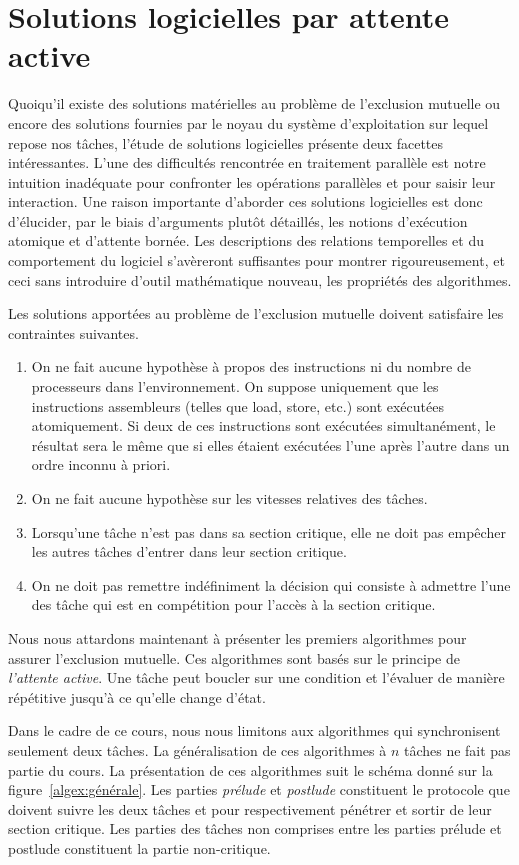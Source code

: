\section{Solutions logicielles par attente active}
Quoiqu'il existe des solutions matérielles au problème de l'exclusion mutuelle ou encore des solutions fournies par le noyau du système d'exploitation sur lequel repose nos tâches, l'étude de solutions logicielles présente deux facettes intéressantes.  L'une des difficultés rencontrée en traitement parallèle est notre intuition inadéquate pour confronter les opérations parallèles et pour saisir leur interaction. Une raison importante d'aborder ces solutions logicielles est donc d'élucider, par le biais d'arguments plutôt détaillés, les notions d'exécution atomique et d'attente bornée.
Les descriptions des relations temporelles et du comportement du logiciel s'avèreront suffisantes pour montrer rigoureusement, et ceci sans introduire d'outil mathématique nouveau, les propriétés des algorithmes.

Les solutions apportées au problème de l'exclusion mutuelle doivent satisfaire les contraintes suivantes.
\begin{enumerate}
  \item On ne fait aucune hypothèse à propos des instructions ni du nombre de processeurs dans l'environnement.
        On suppose uniquement que les instructions assembleurs (telles que load, store, etc.) sont exécutées atomiquement.  Si deux de ces instructions sont exécutées simultanément, le résultat sera le même que si elles étaient exécutées l'une après l'autre dans un ordre inconnu à priori.
  \item On ne fait aucune hypothèse sur les vitesses relatives des tâches.
  \item Lorsqu'une tâche n'est pas dans sa section critique, elle ne doit pas empêcher les autres tâches d'entrer dans leur section critique.
  \item On ne doit pas remettre indéfiniment la décision qui consiste à admettre l'une des tâche qui est en compétition pour l'accès à la section critique.
\end{enumerate}
\par
Nous nous attardons maintenant à présenter les premiers algorithmes pour assurer l'exclusion mutuelle.  Ces algorithmes sont basés sur le principe de {\em l'attente active}.  Une tâche peut boucler sur une condition et l'évaluer de manière répétitive jusqu'à ce qu'elle change d'état.
\par
Dans le cadre de ce cours, nous nous limitons aux algorithmes qui synchronisent seulement deux tâches.  La généralisation de ces algorithmes à $n$ tâches ne fait pas partie du cours.  La présentation de ces algorithmes suit le schéma donné sur la figure~\ref{algex:générale}.
Les parties {\em prélude} et {\em postlude} constituent le protocole que doivent suivre les deux tâches  et  pour respectivement pénétrer et sortir de leur section critique.  Les parties des tâches non comprises entre les parties prélude et postlude constituent la partie non-critique.

